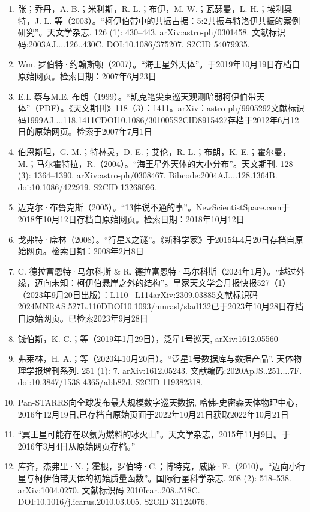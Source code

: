 \begin{enumerate}
\item 张；乔丹，A. B.；米利斯，R. L.；布伊，M. W.；瓦瑟曼，L. H.；埃利奥特，J. L. 等（2003）。“柯伊伯带中的共振占据：5:2共振与特洛伊共振的案例研究”。天文学杂志. 126 (1): 430–443. arXiv:astro-ph/0301458. 文献标识码:2003AJ....126..430C. DOI:10.1086/375207. S2CID 54079935.
\item Wm. 罗伯特·约翰斯顿（2007）。“海王星外天体”。于2019年10月19日存档自原始网页。检索日期：2007年6月23日
\item E.I. 蔡与M.E. 布朗（1999）。“凯克笔尖束巡天观测暗弱柯伊伯带天体”（PDF）。《天文期刊》118（3）：1411。arXiv：astro-ph/9905292文献标识码1999AJ....118.1411CDOI10.1086/301005S2CID8915427存档于2012年6月12日的原始网页。检索于2007年7月1日
\item 伯恩斯坦，G. M.；特林灵，D. E.；艾伦，R. L.；布朗，K. E.；霍尔曼，M.；马尔霍特拉，R.（2004）。“海王星外天体的大小分布”。天文期刊. 128 (3): 1364–1390. arXiv:astro-ph/0308467. Bibcode:2004AJ....128.1364B. doi:10.1086/422919. S2CID 13268096.
\item 迈克尔·布鲁克斯（2005）。“13件说不通的事”。NewScientistSpace.com于2018年10月12日存档自原始网页。检索日期：2018年10月12日
\item 戈弗特·席林（2008）。“行星X之谜”。《新科学家》于2015年4月20日存档自原始网页。检索日期：2008年2月8日
\item C. 德拉富恩特·马尔科斯 & R. 德拉富恩特·马尔科斯（2024年1月）。“越过外缘，迈向未知：柯伊伯悬崖之外的结构”。皇家天文学会月报快报527（1）（2023年9月20日出版）：L110 –L114arXiv:2309.03885文献标识码2024MNRAS.527L.110DDOI10.1093/mnrasl/slad132已于2023年10月28日存档自原始网页。已检索2023年9月28日
\item 钱伯斯，K. C.；等（2019年1月29日），泛星1号巡天, arXiv:1612.05560
\item 弗莱林，H. A.；等（2020年10月20日）。“泛星1号数据库与数据产品”. 天体物理学报增刊系列. 251 (1): 7. arXiv:1612.05243. 文献编码:2020ApJS..251....7F. doi:10.3847/1538-4365/abb82d. S2CID 119382318.
\item Pan-STARRS向全球发布最大规模数字巡天数据, 哈佛-史密森天体物理中心，2016年12月19日,已存档自原始页面于2022年10月21日获取2022年10月21日
\item “冥王星可能存在以氨为燃料的冰火山”。天文学杂志，2015年11月9日。于2016年3月4日从原始网页存档。”
\item 库齐，杰弗里·N.；霍根，罗伯特·C.；博特克，威廉·F.（2010）。“迈向小行星与柯伊伯带天体的初始质量函数”。国际行星科学杂志. 208 (2): 518–538. arXiv:1004.0270. 文献标识码:2010Icar..208..518C. DOI:10.1016/j.icarus.2010.03.005. S2CID 31124076.

\end{enumerate}
